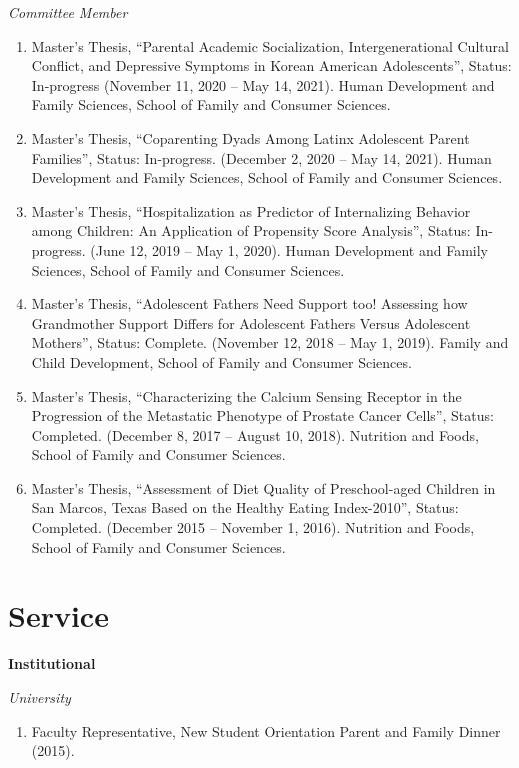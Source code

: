 \documentclass[
]{article}
\providecommand{\tightlist}{%
  \setlength{\itemsep}{0pt}\setlength{\parskip}{0pt}}
\begin{document}
\emph{Committee Member}

\begin{enumerate}
\def\labelenumi{\arabic{enumi}.}
\item
  Master's Thesis, ``Parental Academic Socialization, Intergenerational
  Cultural Conflict, and Depressive Symptoms in Korean American
  Adolescents'', Status: In-progress (November 11, 2020 -- May 14,
  2021). Human Development and Family Sciences, School of Family and
  Consumer Sciences.
\item
  Master's Thesis, ``Coparenting Dyads Among Latinx Adolescent Parent
  Families'', Status: In-progress. (December 2, 2020 -- May 14, 2021).
  Human Development and Family Sciences, School of Family and Consumer
  Sciences.
\item
  Master's Thesis, ``Hospitalization as Predictor of Internalizing
  Behavior among Children: An Application of Propensity Score
  Analysis'', Status: In-progress. (June 12, 2019 -- May 1, 2020). Human
  Development and Family Sciences, School of Family and Consumer
  Sciences.
\item
  Master's Thesis, ``Adolescent Fathers Need Support too! Assessing how
  Grandmother Support Differs for Adolescent Fathers Versus Adolescent
  Mothers'', Status: Complete. (November 12, 2018 -- May 1, 2019).
  Family and Child Development, School of Family and Consumer Sciences.
\item
  Master's Thesis, ``Characterizing the Calcium Sensing Receptor in the
  Progression of the Metastatic Phenotype of Prostate Cancer Cells'',
  Status: Completed. (December 8, 2017 -- August 10, 2018). Nutrition
  and Foods, School of Family and Consumer Sciences.
\item
  Master's Thesis, ``Assessment of Diet Quality of Preschool-aged
  Children in San Marcos, Texas Based on the Healthy Eating
  Index-2010'', Status: Completed. (December 2015 -- November 1, 2016).
  Nutrition and Foods, School of Family and Consumer Sciences.
\end{enumerate}

\hypertarget{service}{%
\section{\texorpdfstring{\textbf{Service}}{Service}}\label{service}}

\textbf{Institutional}

\emph{University}

\begin{enumerate}
\def\labelenumi{\arabic{enumi}.}
\tightlist
\item
  Faculty Representative, New Student Orientation Parent and Family
  Dinner (2015).
\end{enumerate}
\end{document}
